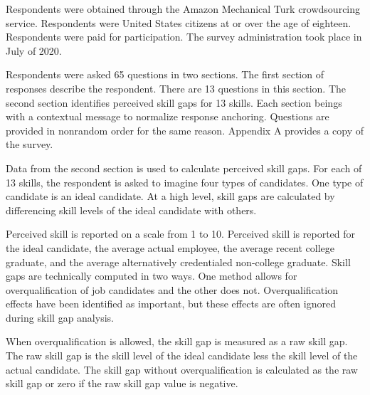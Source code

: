\documentclass[review]{elsarticle}
\begin{document}
Respondents were obtained through the Amazon Mechanical Turk crowdsourcing service.
Respondents were United States citizens at or over the age of eighteen.
Respondents were paid for participation.
The survey administration took place in July of 2020.

Respondents were asked 65 questions in two sections.
The first section of responses describe the respondent.
There are 13 questions in this section.
The second section identifies perceived skill gaps for 13 skills.
Each section beings with a contextual message to normalize response anchoring.
Questions are provided in nonrandom order for the same reason.
Appendix A provides a copy of the survey.


Data from the second section is used to calculate perceived skill gaps.
For each of 13 skills, the respondent is asked to imagine four types of candidates.
One type of candidate is an ideal candidate.
At a high level, skill gaps are calculated by differencing skill levels of the ideal candidate with others.

Perceived skill is reported on a scale from 1 to 10.
Perceived skill is reported for the ideal candidate,
the average actual employee,
the average recent college graduate,
and the average alternatively credentialed non-college graduate.
Skill gaps are technically computed in two ways.
One method allows for overqualification of job candidates and the other does not.
Overqualification effects have been identified as important\cite{green2007there, raybould2005over}, but these effects are often ignored during skill gap analysis\cite{blake_2018}.

When overqualification is allowed, the skill gap is measured as a raw skill gap.
The raw skill gap is the skill level of the ideal candidate less the skill level of the actual candidate.
The skill gap without overqualification is calculated as the raw skill gap or zero if the raw skill gap value is negative.
\end{document}
